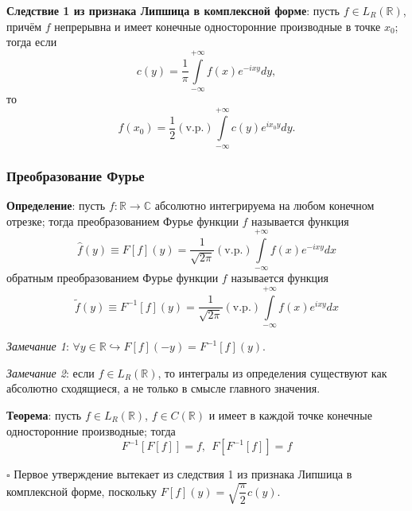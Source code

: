 \documentclass[12pt, a4paper, reqno]{article}
\begin{document}
    \textbf{Следствие 1 из признака Липшица в комплексной форме}: пусть $f \in L_R(\mathbb{R})$,
    причём $f$ непрерывна и имеет конечные односторонние производные в точке $x_0$; тогда если
    \begin{equation*}
        c(y) = \frac{1}{\pi}\int\limits_{-\infty}^{+\infty} f(x)e^{-ixy}dy,
    \end{equation*}
    то
    \begin{equation*}
        f(x_0) = \frac{1}{2}(\text{v.p.})\int\limits_{-\infty}^{+\infty} c(y)e^{ix_0y}dy.
    \end{equation*}

    \subsubsection{Преобразование Фурье}

    \textbf{Определение}: пусть $f: \mathbb{R} \to \mathbb{C}$ абсолютно интегрируема на любом
    конечном отрезке; тогда преобразованием Фурье функции $f$ называется функция
    \begin{equation*}
        \hat{f}(y) \equiv F[f](y) =
            \frac{1}{\sqrt{2\pi}}(\text{v.p.})\int\limits_{-\infty}^{+\infty} f(x)e^{-ixy}dx
    \end{equation*}
    обратным преобразованием Фурье функции $f$ называется функция
    \begin{equation*}
        \tilde{f}(y) \equiv F^{-1}[f](y) =
            \frac{1}{\sqrt{2\pi}}(\text{v.p.})\int\limits_{-\infty}^{+\infty} f(x)e^{ixy}dx
    \end{equation*}

    \textit{Замечание 1}: $\forall y \in \mathbb{R} \hookrightarrow F[f](-y) = F^{-1}[f](y)$.

    \textit{Замечание 2}: если $f \in L_R(\mathbb{R})$, то интегралы из определения существуют как
    абсолютно сходящиеся, а не только в смысле главного значения.

    \textbf{Теорема}: пусть $f \in L_R(\mathbb{R})$, $f \in C(\mathbb{R})$ и имеет в каждой точке
    конечные односторонние производные; тогда
    \begin{equation*}
        F^{-1}[F[f]] = f,\ \ F[F^{-1}[f]] = f
    \end{equation*}

    $\square$
    Первое утверждение вытекает из следствия 1 из признака Липшица в комплексной форме, поскольку
    $F[f](y) = \sqrt{\dfrac{\pi}{2}} c(y)$.
\end{document}
